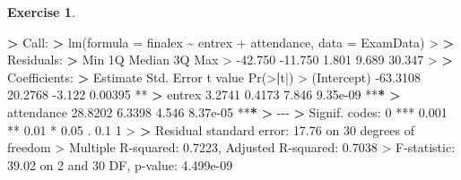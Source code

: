 \documentclass[
]{book}
\newenvironment{Shaded}{\begin{snugshade}}{\end{snugshade}}
\newcommand{\AttributeTok}[1]{\textcolor[rgb]{0.77,0.63,0.00}{#1}}
\newcommand{\DecValTok}[1]{\textcolor[rgb]{0.00,0.00,0.81}{#1}}
\newcommand{\ErrorTok}[1]{\textcolor[rgb]{0.64,0.00,0.00}{\textbf{#1}}}
\newcommand{\FloatTok}[1]{\textcolor[rgb]{0.00,0.00,0.81}{#1}}
\newcommand{\FunctionTok}[1]{\textcolor[rgb]{0.00,0.00,0.00}{#1}}
\newcommand{\NormalTok}[1]{#1}
\newcommand{\SpecialCharTok}[1]{\textcolor[rgb]{0.00,0.00,0.00}{#1}}
\newcommand{\StringTok}[1]{\textcolor[rgb]{0.31,0.60,0.02}{#1}}
\theoremstyle{definition}
\theoremstyle{definition}
\theoremstyle{definition}
\newtheorem{exercise}{Exercise}[chapter]
\theoremstyle{definition}
\theoremstyle{remark}
\begin{document}
\begin{exercise}
\begin{Shaded}
\begin{Highlighting}[]
\ErrorTok{\textgreater{}}\NormalTok{ Call}\SpecialCharTok{:}
\ErrorTok{\textgreater{}} \FunctionTok{lm}\NormalTok{(}\AttributeTok{formula =}\NormalTok{ finalex }\SpecialCharTok{\textasciitilde{}}\NormalTok{ entrex }\SpecialCharTok{+}\NormalTok{ attendance, }\AttributeTok{data =}\NormalTok{ ExamData)}
\SpecialCharTok{\textgreater{}} 
\ErrorTok{\textgreater{}}\NormalTok{ Residuals}\SpecialCharTok{:}
\ErrorTok{\textgreater{}}\NormalTok{     Min      1Q  Median      3Q     Max }
\SpecialCharTok{\textgreater{}} \SpecialCharTok{{-}}\FloatTok{42.750} \SpecialCharTok{{-}}\FloatTok{11.750}   \FloatTok{1.801}   \FloatTok{9.689}  \FloatTok{30.347} 
\SpecialCharTok{\textgreater{}} 
\ErrorTok{\textgreater{}}\NormalTok{ Coefficients}\SpecialCharTok{:}
\ErrorTok{\textgreater{}}\NormalTok{             Estimate Std. Error t value }\FunctionTok{Pr}\NormalTok{(}\SpecialCharTok{\textgreater{}}\ErrorTok{|}\NormalTok{t}\SpecialCharTok{|}\NormalTok{)    }
\SpecialCharTok{\textgreater{}}\NormalTok{ (Intercept) }\SpecialCharTok{{-}}\FloatTok{63.3108}    \FloatTok{20.2768}  \SpecialCharTok{{-}}\FloatTok{3.122}  \FloatTok{0.00395} \SpecialCharTok{**} 
\ErrorTok{\textgreater{}}\NormalTok{ entrex        }\FloatTok{3.2741}     \FloatTok{0.4173}   \FloatTok{7.846} \FloatTok{9.35e{-}09} \SpecialCharTok{**}\ErrorTok{*}
\ErrorTok{\textgreater{}}\NormalTok{ attendance   }\FloatTok{28.8202}     \FloatTok{6.3398}   \FloatTok{4.546} \FloatTok{8.37e{-}05} \SpecialCharTok{**}\ErrorTok{*}
\ErrorTok{\textgreater{}} \SpecialCharTok{{-}{-}{-}}
\ErrorTok{\textgreater{}}\NormalTok{ Signif. codes}\SpecialCharTok{:}  \DecValTok{0} \StringTok{\textquotesingle{}***\textquotesingle{}} \FloatTok{0.001} \StringTok{\textquotesingle{}**\textquotesingle{}} \FloatTok{0.01} \StringTok{\textquotesingle{}*\textquotesingle{}} \FloatTok{0.05} \StringTok{\textquotesingle{}.\textquotesingle{}} \FloatTok{0.1} \StringTok{\textquotesingle{} \textquotesingle{}} \DecValTok{1}
\SpecialCharTok{\textgreater{}} 
\ErrorTok{\textgreater{}}\NormalTok{ Residual standard error}\SpecialCharTok{:} \FloatTok{17.76}\NormalTok{ on }\DecValTok{30}\NormalTok{ degrees of freedom}
\SpecialCharTok{\textgreater{}}\NormalTok{ Multiple R}\SpecialCharTok{{-}}\NormalTok{squared}\SpecialCharTok{:}  \FloatTok{0.7223}\NormalTok{,  Adjusted R}\SpecialCharTok{{-}}\NormalTok{squared}\SpecialCharTok{:}  \FloatTok{0.7038} 
\SpecialCharTok{\textgreater{}}\NormalTok{ F}\SpecialCharTok{{-}}\NormalTok{statistic}\SpecialCharTok{:} \FloatTok{39.02}\NormalTok{ on }\DecValTok{2}\NormalTok{ and }\DecValTok{30}\NormalTok{ DF,  p}\SpecialCharTok{{-}}\NormalTok{value}\SpecialCharTok{:} \FloatTok{4.499e{-}09}

\end{Highlighting}
\end{Shaded}
\end{exercise}
\end{document}
